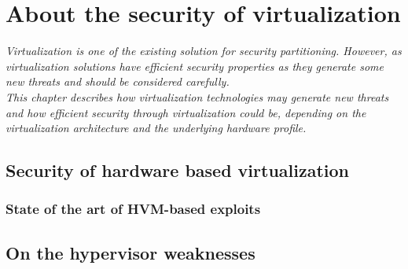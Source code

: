 
\chapter{About the security of virtualization}
\label{chap:virtsec}

{\it
Virtualization is one of the existing solution for security partitioning. However, as
virtualization solutions have efficient security properties as they generate some new threats and
should be considered carefully.\\
This chapter describes how virtualization technologies may generate new threats and how efficient
security through virtualization could be, depending on the virtualization architecture and the
underlying hardware profile.
}

\doMinitoc

\section{Security of hardware based virtualization}

\subsection{State of the art of HVM-based exploits}

\section{On the hypervisor weaknesses}

